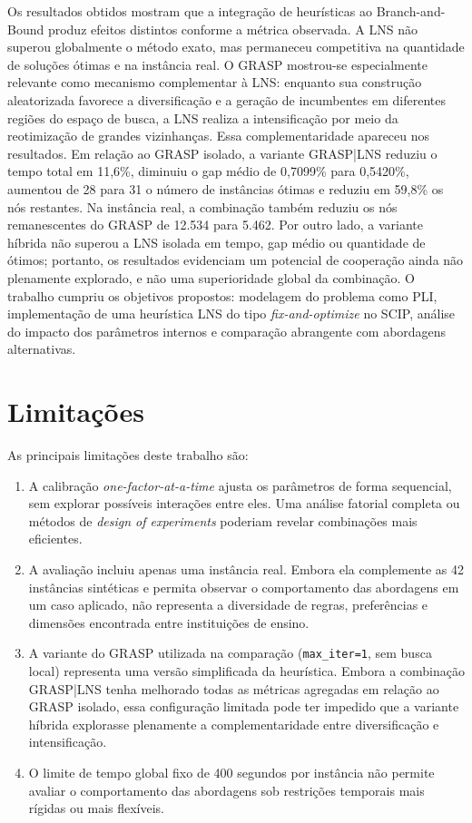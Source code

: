 Os resultados obtidos mostram que a integração de heurísticas ao Branch-and-Bound produz efeitos distintos conforme a métrica observada. A LNS não superou globalmente o método exato, mas permaneceu competitiva na quantidade de soluções ótimas e na instância real. O GRASP mostrou-se especialmente relevante como mecanismo complementar à LNS: enquanto sua construção aleatorizada favorece a diversificação e a geração de incumbentes em diferentes regiões do espaço de busca, a LNS realiza a intensificação por meio da reotimização de grandes vizinhanças. Essa complementaridade apareceu nos resultados. Em relação ao GRASP isolado, a variante GRASP|LNS reduziu o tempo total em 11,6\%, diminuiu o gap médio de 0,7099\% para 0,5420\%, aumentou de 28 para 31 o número de instâncias ótimas e reduziu em 59,8\% os nós restantes. Na instância real, a combinação também reduziu os nós remanescentes do GRASP de 12.534 para 5.462. Por outro lado, a variante híbrida não superou a LNS isolada em tempo, gap médio ou quantidade de ótimos; portanto, os resultados evidenciam um potencial de cooperação ainda não plenamente explorado, e não uma superioridade global da combinação. O trabalho cumpriu os objetivos propostos: modelagem do problema como PLI, implementação de uma heurística LNS do tipo \textit{fix-and-optimize} no SCIP, análise do impacto dos parâmetros internos e comparação abrangente com abordagens alternativas.

\section{Limitações}

As principais limitações deste trabalho são:

\begin{enumerate}
  \item A calibração \emph{one-factor-at-a-time} ajusta os parâmetros de forma sequencial, sem explorar possíveis interações entre eles. Uma análise fatorial completa ou métodos de \emph{design of experiments} poderiam revelar combinações mais eficientes.

  \item A avaliação incluiu apenas uma instância real. Embora ela complemente as 42 instâncias sintéticas e permita observar o comportamento das abordagens em um caso aplicado, não representa a diversidade de regras, preferências e dimensões encontrada entre instituições de ensino.

  \item A variante do GRASP utilizada na comparação (\texttt{max\_iter=1}, sem busca local) representa uma versão simplificada da heurística. Embora a combinação GRASP|LNS tenha melhorado todas as métricas agregadas em relação ao GRASP isolado, essa configuração limitada pode ter impedido que a variante híbrida explorasse plenamente a complementaridade entre diversificação e intensificação.

  \item O limite de tempo global fixo de 400 segundos por instância não permite avaliar o comportamento das abordagens sob restrições temporais mais rígidas ou mais flexíveis.
\end{enumerate}

